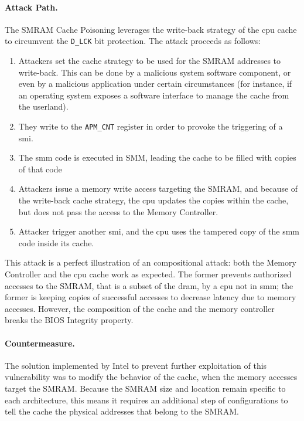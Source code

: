 \paragraph{Attack Path.}
%
The SMRAM Cache Poisoning leverages the write-back strategy of the \ac{cpu}
cache to circumvent the \texttt{D\_LCK} bit protection.
%
The attack proceeds as follows:

\begin{enumerate}
\item Attackers set the cache strategy to be used for the SMRAM addresses to
  write-back.
  This can be done by a malicious system software component, or even by a
  malicious application under certain circumstances (for instance, if an
  operating system exposes a software interface to manage the cache from the
  userland).

%
\item They write to the \texttt{APM\_CNT} register in order to provoke the
  triggering of a \ac{smi}.
%
\item The \ac{smm} code is executed in SMM, leading the cache to be filled with
  copies of that code
%
\item Attackers issue a memory write access targeting the SMRAM, and because of
  the write-back cache strategy, the \ac{cpu} updates the copies within the
  cache, but does not pass the access to the Memory Controller.
%
\item Attacker trigger another \ac{smi}, and the \ac{cpu} uses the tampered copy
  of the \ac{smm} code inside its cache.
\end{enumerate}
%
This attack is a perfect illustration of an compositional attack:
%
both the Memory Controller and the \ac{cpu} cache work as expected.
%
The former prevents authorized accesses to the SMRAM, that is a subset of the
\ac{dram}, by a \ac{cpu} not in \ac{smm};
%
the former is keeping copies of successful accesses to decrease latency due to
memory accesses.
%
However, the composition of the cache and the memory controller breaks the BIOS
Integrity property.

\paragraph{Countermeasure.}
%
The solution implemented by Intel to prevent further exploitation of this
vulnerability was to modify the behavior of the cache, when the memory accesses
target the SMRAM.
%
Because the SMRAM size and location remain specific to each architecture, this
means it requires an additional step of configurations to tell the cache the
physical addresses that belong to the SMRAM.

